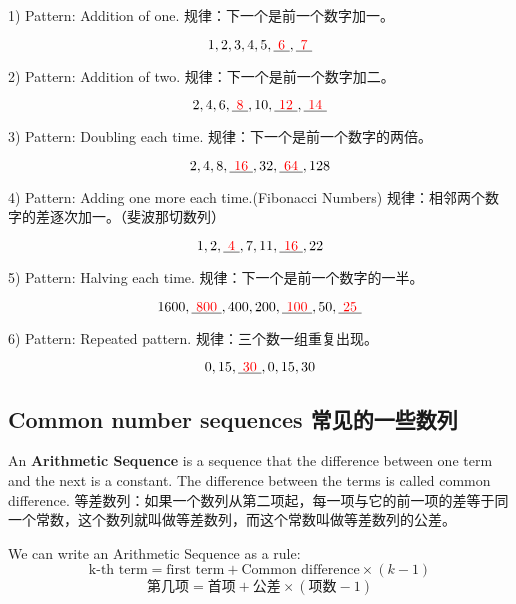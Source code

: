 \begin{solution}
\begin{paracol}{2}
1) Pattern: Addition of one.
\switchcolumn
规律：下一个是前一个数字加一。
\end{paracol}
$$
1, 2, 3, 4, 5, \underline{{\color{red}\ 6\ }}, \underline{{\color{red}\ 7\ }}
$$
\begin{paracol}{2}
2) Pattern: Addition of two.
\switchcolumn
规律：下一个是前一个数字加二。
\end{paracol}
$$
2, 4, 6, \underline{{\color{red}\ 8\ }}, 10, \underline{{\color{red}\ 12\ }}, \underline{{\color{red}\ 14\ }}
$$
\begin{paracol}{2}
3) Pattern: Doubling each time.
\switchcolumn
规律：下一个是前一个数字的两倍。
\end{paracol}
$$
2, 4, 8, \underline{{\color{red}\ 16\ }}, 32, \underline{{\color{red}\ 64\ }}, 128
$$
\begin{paracol}{2}
4) Pattern: Adding one more each time.(Fibonacci Numbers)
\switchcolumn
规律：相邻两个数字的差逐次加一。（斐波那切数列）
\end{paracol}
$$
1, 2, \underline{{\color{red}\ 4\ }}, 7, 11,  \underline{{\color{red}\ 16\ }}, 22
$$
\begin{paracol}{2}
5) Pattern: Halving each time. 
\switchcolumn
规律：下一个是前一个数字的一半。
\end{paracol}
$$
1600,\underline{{\color{red}\ 800\ }} , 400, 200, \underline{{\color{red}\ 100\ }}, 50, \underline{{\color{red}\ 25\ }}
$$
\begin{paracol}{2}
6) Pattern: Repeated pattern.
\switchcolumn
规律：三个数一组重复出现。
\end{paracol}
$$
0, 15, \underline{{\color{red}\ 30\ }}, 0, 15, 30
$$
\end{solution}

\subsection{Common number sequences 常见的一些数列}
\begin{paracol}{2}
An {\bf Arithmetic Sequence} is a sequence that the difference between one term and the next is a constant. The difference between the terms is called common difference.
\switchcolumn
等差数列：如果一个数列从第二项起，每一项与它的前一项的差等于同一个常数，这个数列就叫做等差数列，而这个常数叫做等差数列的公差。
\end{paracol}
\begin{newprop}[通项公式]
We can write an Arithmetic Sequence as a rule:
$$
\text{k-th term} = \text{first term} + \text{Common difference}\times(k-1)
$$
$$
\text{第几项} = \text{首项} + \text{公差}\times(\text{项数}-1)
$$
\end{newprop}

